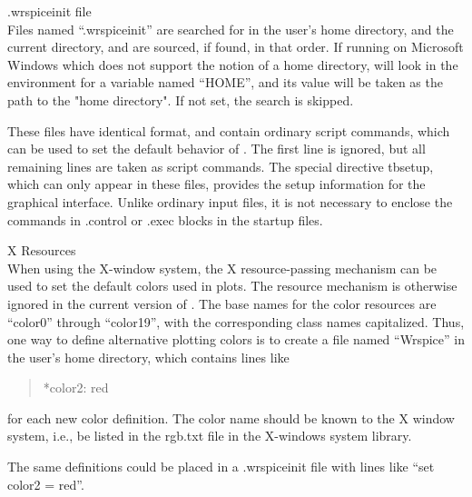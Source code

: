 \begin{description}

\item{{\vt .wrspiceinit} file}\\
Files named ``{\vt .wrspiceinit}'' are searched for in the user's home
directory, and the current directory, and are sourced, if found, in
that order.  If running on Microsoft Windows which does not support
the notion of a home directory, {\WRspice} will look in the
environment for a variable named ``{\et HOME}'', and its value will be
taken as the path to the "home directory".  If not set, the search is
skipped.

These files have identical format, and contain ordinary script
commands, which can be used to set the default behavior of {\WRspice}. 
The first line is ignored, but all remaining lines are taken as script
commands.  The special directive {\vt tbsetup}, which can only appear
in these files, provides the setup information for the graphical
interface.  Unlike ordinary input files, it is not necessary to
enclose the commands in {\vt .control} or {\vt .exec} blocks in the
startup files.

\item{X Resources}\\
When using the X-window system, the X resource-passing mechanism can
be used to set the default colors used in plots.  The resource
mechanism is otherwise ignored in the current version of {\WRspice}. 
The base names for the color resources are ``{\vt color0}'' through
``{\vt color19}'', with the corresponding class names capitalized. 
Thus, one way to define alternative plotting colors is to create a
file named ``{\vt Wrspice}'' in the user's home directory, which
contains lines like
\begin{quote}\vt
*color2: red
\end{quote}
for each new color definition.  The color name should be known to the
X window system, i.e., be listed in the {\vt rgb.txt} file in the
X-windows system library.

The same definitions could be placed in a {\vt .wrspiceinit} file with
lines like ``{\vt set color2 = red}''.
\end{description}

